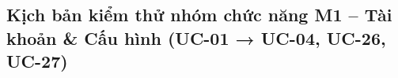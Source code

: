 \subsection{Kịch bản kiểm thử nhóm chức năng M1 – Tài khoản \& Cấu hình (UC-01 → UC-04, UC-26, UC-27)}
